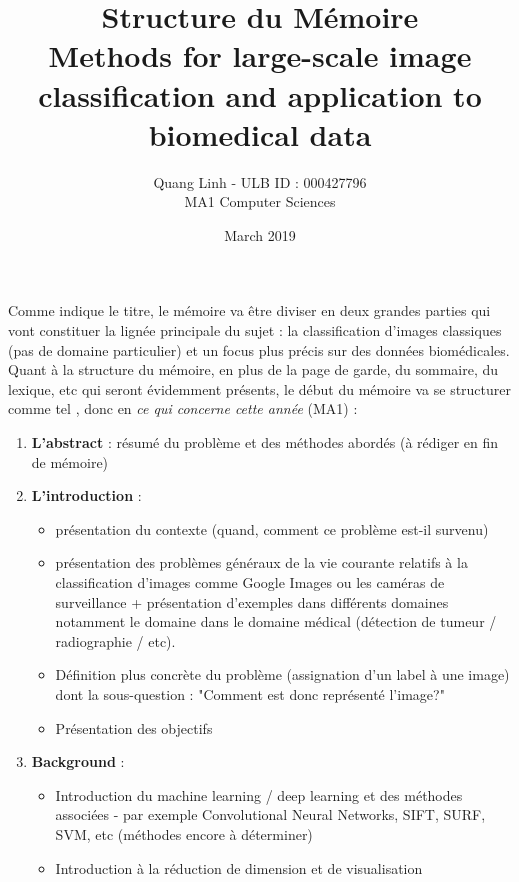 \documentclass{article}
\title{Structure du Mémoire \\ Methods for large-scale image classification and application to biomedical data}
\author{\bsc{BUI QUANG PHUONG} Quang Linh - ULB ID : 000427796 \\ MA1 Computer Sciences}
\date{March 2019}
\begin{document}
\maketitle

Comme indique le titre, le mémoire va être diviser en deux grandes parties qui vont constituer la lignée principale du sujet : la classification d'images classiques (pas de domaine particulier) et un focus plus précis sur des données biomédicales. \\

Quant à la structure du mémoire, en plus de la page de garde, du sommaire, du lexique, etc qui seront évidemment présents, le début du mémoire va se structurer comme tel , donc en \textit{ce qui concerne cette année} (MA1) : 

\begin{enumerate}
\item \textbf{L'abstract} : résumé du problème et des méthodes abordés (à rédiger en fin de mémoire) 
\item \textbf{L'introduction} : 
\begin{itemize}
\item présentation du contexte (quand, comment ce problème est-il survenu) 
\item présentation des problèmes généraux de la vie courante relatifs à la classification d'images comme Google Images ou les caméras de surveillance + présentation d'exemples dans différents domaines notamment le domaine dans le domaine médical (détection de tumeur / radiographie / etc). 
\item Définition plus concrète du problème (assignation d'un label à une image) dont la sous-question : "Comment est donc représenté l'image?" 
\item Présentation des objectifs 
\end{itemize}  

\item \textbf{Background} : 
\begin{itemize}
\item Introduction du machine learning / deep learning et des méthodes associées - par exemple Convolutional Neural Networks, SIFT, SURF, SVM, etc (méthodes encore à déterminer)
\item Introduction à la réduction de dimension et de visualisation
\end{itemize}


\end{enumerate}
\end{document}
